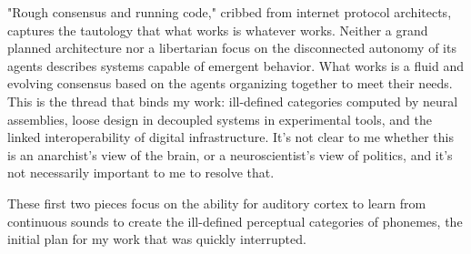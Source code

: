 "Rough consensus and running code," cribbed from internet protocol architects\citep{clarkCloudyCrystalBall1992}, captures the tautology that what works is whatever works. Neither a grand planned architecture nor a libertarian focus on the disconnected autonomy of its agents describes systems capable of emergent behavior. What works is a fluid and evolving consensus based on the agents organizing together to meet their needs. This is the thread that binds my work: ill-defined categories computed by neural assemblies, loose design in decoupled systems in experimental tools, and the linked interoperability of digital infrastructure.  It's not clear to me whether this is an anarchist's view of the brain, or a neuroscientist's view of politics, and it's not necessarily important to me to resolve that.

These first two pieces focus on the ability for auditory cortex to learn from continuous sounds to create the ill-defined perceptual categories of phonemes, the initial plan for my work that was quickly interrupted.



